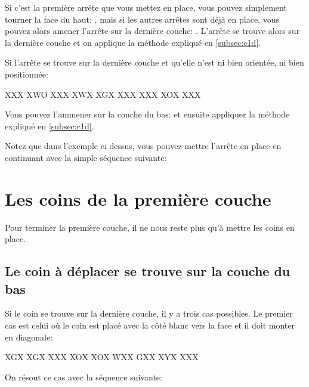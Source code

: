 Si c'est la première arrête que vous mettez en place, vous pouvez simplement tourner la face du haut: , mais si les autres arrêtes sont déjà en place, vous pouvez alors amener l'arrête sur la dernière couche: . L'arrête se trouve alors sur la dernière couche et on applique la méthode expliqué en \ref{subsec:c1d}.

Si l'arrête se trouve sur la dernière couche et qu'elle n'est ni bien orientée, ni bien positionnée:

\begin{center}
	\RubikFaceUp%
	{X}{X}{X}%
	{X}{W}{O}%
	{X}{X}{X}
	\RubikFaceRight%
	{X}{W}{X}%
	{X}{G}{X}%
	{X}{X}{X}
	\RubikFaceFront%
	{X}{X}{X}%
	{X}{O}{X}%
	{X}{X}{X}
\end{center}

Vous pouvez l'ammener sur la couche du bas:  et ensuite appliquer la méthode expliqué en \ref{subsec:c1d}.

Notez que dans l'exemple ci dessus, vous pouvez mettre l'arrête en place en continuant avec la simple séquence suivante: 

\section{Les coins de la première couche}

Pour terminer la première couche, il ne nous reste plus qu'à mettre les coins en place.

\subsection{Le coin à déplacer se trouve sur la couche du bas}
\label{subsec:c1cd}

Si le coin se trouve sur la dernière couche, il y a trois cas possibles.
Le premier cas est celui où le coin est placé avec la côté blanc vers
la face et il doit monter en diagonale: 

\begin{center}  	
	\RubikFaceRight%
	{X}{G}{X}%
	{X}{G}{X}%
	{X}{X}{X}
	\RubikFaceFront%
	{X}{O}{X}%
	{X}{O}{X}%
	{W}{X}{X}
	\RubikFaceDown%
	{G}{X}{X}%
	{X}{Y}{X}%
	{X}{X}{X}
	
\end{center} 

On résout ce cas avec la séquence suivante:

